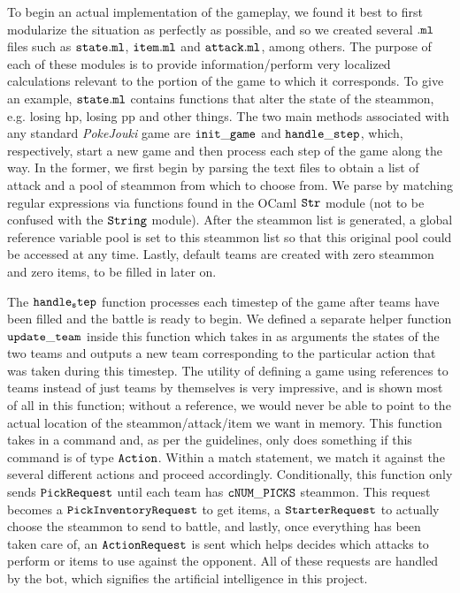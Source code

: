 \documentclass[10pt]{article}
\begin{document}
To begin an actual implementation of the gameplay, we found it best to first modularize the situation as perfectly as possible, and so we created several $\tt{.ml}$ files such as $\tt{state.ml}$, $\tt{item.ml}$ and $\tt{attack.ml}$, among others. The purpose of each of these modules is to provide information/perform very localized calculations relevant to the portion of the game to which it corresponds. To give an example, $\tt{state.ml}$ contains functions that alter the state of the steammon, e.g. losing hp, losing pp and other things. The two main methods associated with any standard \textit{PokeJouki} game are $\tt{init\_game}$ and $\tt{handle\_step}$, which, respectively, start a new game and then process each step of the game along the way. In the former, we first begin by parsing the text files to obtain a list of attack and a pool of steammon from which to choose from. We parse by matching regular expressions via functions found in the OCaml $\tt{Str}$ module (not to be confused with the $\tt{String}$ module). After the steammon list is generated, a global reference variable pool is set to this steammon list so that this original pool could be accessed at any time. Lastly, default teams are created with zero steammon and zero items, to be filled in later on.

The $\tt{handle_step}$ function processes each timestep of the game after teams have been filled and the battle is ready to begin. We defined a separate helper function $\tt{update\_team}$ inside this function which takes in as arguments the states of the two teams and outputs a new team corresponding to the particular action that was taken during this timestep. The utility of defining a game using references to teams instead of just teams by themselves is very impressive, and is shown most of all in this function; without a reference, we would never be able to point to the actual location of the steammon/attack/item we want in memory. This function takes in a command and, as per the guidelines, only does something if this command is of type $\tt{Action}$. Within a match statement, we match it against the several different actions and proceed accordingly. Conditionally, this function only sends $\tt{PickRequest}$ until each team has $\tt{cNUM\_PICKS}$ steammon. This request becomes a $\tt{PickInventoryRequest}$ to get items, a $\tt{StarterRequest}$ to actually choose the steammon to send to battle, and lastly, once everything has been taken care of, an $\tt{ActionRequest}$ is sent which helps decides which attacks to perform or items to use against the opponent. All of these requests are handled by the bot, which signifies the artificial intelligence in this project.
\end{document}
